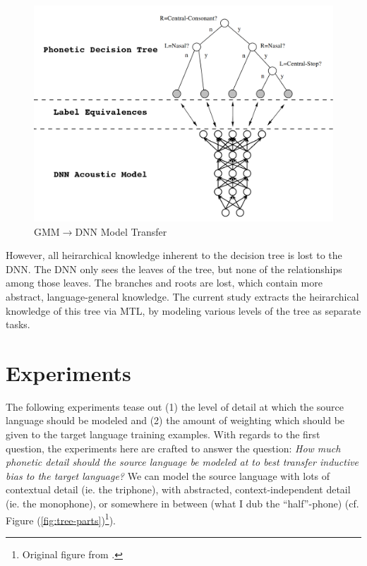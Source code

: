 \documentclass[a4paper]{article}
\begin{document}
\begin{figure}[!htbp]
  \centering
{}
  \includegraphics[width=\linewidth]{figs-1/tree-net.png}
  \caption{GMM$\rightarrow$DNN Model Transfer}
    \label{fig:tree-net}
  \endminipage\hfill
\end{figure}

However, all heirarchical knowledge inherent to the decision tree is lost to the DNN. The DNN only sees the leaves of the tree, but none of the relationships among those leaves. The branches and roots are lost, which contain more abstract, language-general knowledge. The current study extracts the heirarchical knowledge of this tree via MTL, by modeling various levels of the tree as separate tasks. 


\section{Experiments}

The following experiments tease out (1) the level of detail at which the source language should be modeled and (2) the amount of weighting which should be given to the target language training examples. With regards to the first question, the experiments here are crafted to answer the question: \textit{How much phonetic detail should the source language be modeled at to best transfer inductive bias to the target language?} We can model the source language with lots of contextual detail (ie. the triphone), with abstracted, context-independent detail (ie. the monophone), or somewhere in between (what I dub the ``half''-phone) (cf. Figure (\ref{fig:tree-parts})\footnote{Original figure from \cite{young2002}.}).
\end{document}

